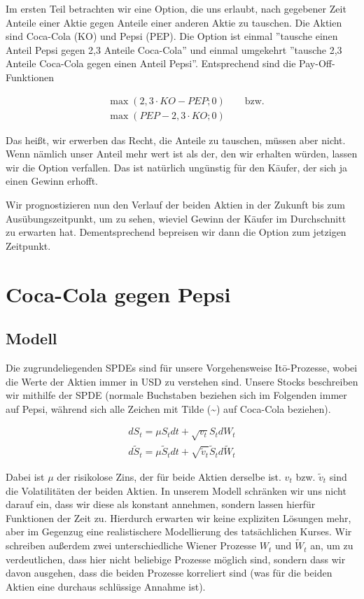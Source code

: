 \documentclass[12pt]{article}
\begin{document}
Im ersten Teil betrachten wir eine Option, die uns erlaubt, nach gegebener Zeit Anteile einer Aktie gegen Anteile einer anderen Aktie zu tauschen. Die Aktien sind Coca-Cola (KO) und Pepsi (PEP). Die Option ist einmal ''tausche einen Anteil Pepsi gegen 2,3 Anteile Coca-Cola'' und einmal umgekehrt ''tausche 2,3 Anteile Coca-Cola gegen einen Anteil Pepsi''. Entsprechend sind die Pay-Off-Funktionen

\begin{align*}
&\max(2,3\cdot KO - PEP; 0) \qquad \text{bzw.} \\
&\max(PEP - 2,3\cdot KO; 0)
\end{align*}

Das heißt, wir erwerben das Recht, die Anteile zu tauschen, müssen aber nicht. Wenn nämlich unser Anteil mehr wert ist als der, den wir erhalten würden, lassen wir die Option verfallen. Das ist natürlich ungünstig für den Käufer, der sich ja einen Gewinn erhofft.

Wir prognostizieren nun den Verlauf der beiden Aktien in der Zukunft bis zum Ausübungszeitpunkt, um zu sehen, wieviel Gewinn der Käufer im Durchschnitt zu erwarten hat. Dementsprechend bepreisen wir dann die Option zum jetzigen Zeitpunkt.


\section{Coca-Cola gegen Pepsi}

\subsection{Modell}

Die zugrundeliegenden SPDEs sind für unsere Vorgehensweise It\={o}-Prozesse, wobei die Werte der Aktien immer in USD zu verstehen sind. Unsere Stocks beschreiben wir mithilfe der SPDE (normale Buchstaben beziehen sich im Folgenden immer auf Pepsi, während sich alle Zeichen mit Tilde (\~{}) auf Coca-Cola beziehen).

\begin{align}\label{SPDEstock}
dS_t = \mu S_t dt + \sqrt{v_t} S_t dW_t \\
d\tilde{S}_t = \mu \tilde{S}_t dt + \sqrt{\tilde{v}_t} \tilde{S}_t d\tilde{W}_t
\end{align}

Dabei ist $\mu$ der risikolose Zins, der für beide Aktien derselbe ist. $v_t$ bzw. $\tilde{v}_t$ sind die Volatilitäten der beiden Aktien. In unserem Modell schränken wir uns nicht darauf ein, dass wir diese als konstant annehmen, sondern lassen hierfür Funktionen der Zeit zu. Hierdurch erwarten wir keine expliziten Lösungen mehr, aber im Gegenzug eine realistischere Modellierung des tatsächlichen Kurses. Wir schreiben außerdem zwei unterschiedliche Wiener Prozesse $W_t$ und $\tilde{W}_t$ an, um zu verdeutlichen, dass hier nicht beliebige Prozesse möglich sind, sondern dass wir davon ausgehen, dass die beiden Prozesse korreliert sind (was für die beiden Aktien eine durchaus schlüssige Annahme ist).
\end{document}
